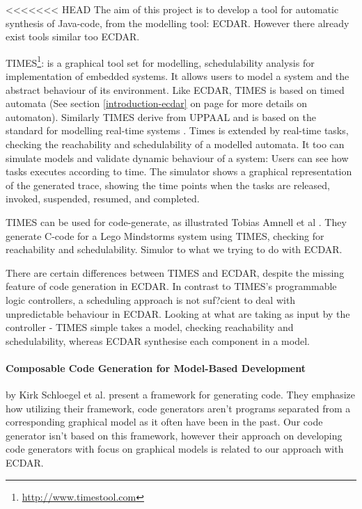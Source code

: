 <<<<<<< HEAD
The aim of this project is to develop a tool for automatic synthesis of Java-code, from the modelling tool: ECDAR. However there already exist tools similar too ECDAR.

TIMES\footnote{\url{http://www.timestool.com}}: is a graphical tool set for modelling, schedulability analysis for implementation of embedded systems. It allows users to model a system and the abstract behaviour of its environment. 
Like ECDAR, TIMES is based on timed automata (See section \ref{introduction-ecdar} on page \pageref{introduction-ecdar} for more details on automaton). Similarly TIMES derive from UPPAAL and is based on the standard for modelling real-time systems \cite{Alur1994:183}.
Times is extended by real-time tasks, checking the reachability and schedulability of a modelled automata. It too can simulate models and validate dynamic behaviour of a system: Users can see how tasks executes according to time. The simulator shows a graphical representation of the generated trace, showing the time points when the tasks are released, invoked, suspended, resumed, and completed.

TIMES can be used for code-generate, as illustrated Tobias Amnell et al \cite{Amnell:2002:CST:779110.779112}. They generate C-code for a Lego Mindstorms system using TIMES, checking for reachability and schedulability. Simulor to what we trying to do with ECDAR. 

There are certain differences between TIMES and ECDAR, despite the missing feature of code generation in ECDAR. In contrast to TIMES's programmable logic controllers, a scheduling approach is not suf?cient to deal with unpredictable behaviour in ECDAR.
Looking at what are taking as input by the controller - TIMES simple takes a model, checking reachability and schedulability, whereas ECDAR synthesise each component in a model.



\paragraph{Composable Code Generation for Model-Based Development}
by Kirk Schloegel et al. present a framework for generating
code\cite{composable-code-generation}. They emphasize how utilizing their
framework, code generators aren't programs separated from a corresponding
graphical model as it often have been in the past. Our code generator isn't
based on this framework, however their approach on developing code generators
with focus on graphical models is related to our approach with ECDAR.

